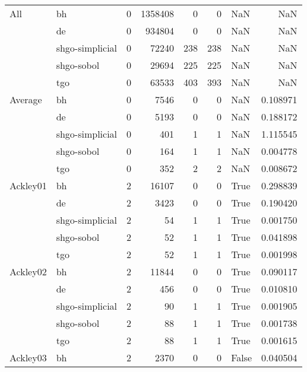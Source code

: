 \begin{longtable}{llrrrrlr}
\bottomrule
\endlastfoot
All & bh &     0 &  1358408 &      0 &       0 &     NaN &         NaN \\
         & de &     0 &   934804 &      0 &       0 &     NaN &         NaN \\
         & shgo-simplicial &     0 &    72240 &    238 &     238 &     NaN &         NaN \\
         & shgo-sobol &     0 &    29694 &    225 &     225 &     NaN &         NaN \\
         & tgo &     0 &    63533 &    403 &     393 &     NaN &         NaN \\
\midrule
Average & bh &     0 &     7546 &      0 &       0 &     NaN &    0.108971 \\
         & de &     0 &     5193 &      0 &       0 &     NaN &    0.188172 \\
         & shgo-simplicial &     0 &      401 &      1 &       1 &     NaN &    1.115545 \\
         & shgo-sobol &     0 &      164 &      1 &       1 &     NaN &    0.004778 \\
         & tgo &     0 &      352 &      2 &       2 &     NaN &    0.008672 \\
         \midrule
Ackley01 & bh &     2 &    16107 &      0 &       0 &    True &    0.298839 \\
         & de &     2 &     3423 &      0 &       0 &    True &    0.190420 \\
         & shgo-simplicial &     2 &       54 &      1 &       1 &    True &    0.001750 \\
         & shgo-sobol &     2 &       52 &      1 &       1 &    True &    0.041898 \\
         & tgo &     2 &       52 &      1 &       1 &    True &    0.001998 \\
Ackley02 & bh &     2 &    11844 &      0 &       0 &    True &    0.090117 \\
         & de &     2 &      456 &      0 &       0 &    True &    0.010810 \\
         & shgo-simplicial &     2 &       90 &      1 &       1 &    True &    0.001905 \\
         & shgo-sobol &     2 &       88 &      1 &       1 &    True &    0.001738 \\
         & tgo &     2 &       88 &      1 &       1 &    True &    0.001615 \\
Ackley03 & bh &     2 &     2370 &      0 &       0 &   False &    0.040504 \\

\end{longtable}
